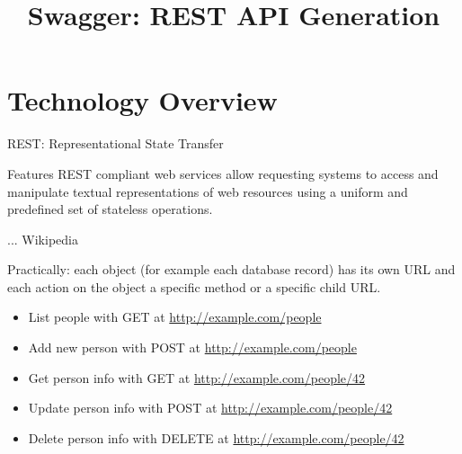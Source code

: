 \RequirePackage{slides-shared}
\title{Swagger: REST API Generation}



\makepreamble

\section{Technology Overview}


\begin{frame}{REST: Representational State Transfer}
    \begin{block}{Features}
        REST compliant web services allow requesting systems to access
        and manipulate textual representations of web resources using
        a uniform and predefined set of stateless operations.

        \hfill ... Wikipedia
    \end{block}

    \bigskip

    Practically: each object (for example each database record) has its own URL
    and each action on the object a specific method or a specific child URL.

    \medskip

    \begin{itemize}
        \item List people with GET at \url{http://example.com/people}
        \item Add new person with POST at \url{http://example.com/people}
        \item Get person info with GET at \url{http://example.com/people/42}
        \item Update person info with POST at \url{http://example.com/people/42}
        \item Delete person info with DELETE at \url{http://example.com/people/42}
    \end{itemize}

\end{frame}


